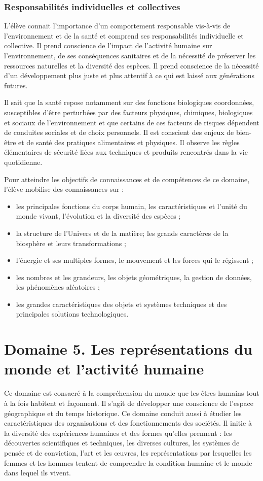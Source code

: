 \subsubsection{Responsabilités individuelles et collectives}
L’élève connait l’importance d’un comportement responsable vis-à-vis de l’environnement et de la santé et comprend ses responsabilités individuelle et collective. Il prend conscience de l’impact de l’activité humaine sur l’environnement, de ses conséquences sanitaires et de la nécessité de préserver les ressources naturelles et la diversité des espèces. Il prend conscience de la nécessité d’un développement plus juste et plus attentif à ce qui est laissé aux générations futures.

Il sait que la santé repose notamment sur des fonctions biologiques coordonnées, susceptibles d’être perturbées par des facteurs physiques, chimiques, biologiques et sociaux de l’environnement et que certains de ces facteurs de risques dépendent de conduites sociales et de choix personnels. Il est conscient des enjeux de bien-être et de santé des pratiques alimentaires et physiques. Il observe les règles élémentaires de sécurité liées aux techniques et produits rencontrés dans la vie quotidienne.
 
Pour atteindre les objectifs de connaissances et de compétences de ce domaine, l’élève mobilise des connaissances sur :
\begin{itemize}
\item les principales fonctions du corps humain, les caractéristiques et l’unité du monde vivant, l’évolution et la diversité des espèces ;
\item la structure de l’Univers et de la matière; les grands caractères de la biosphère et leurs transformations ;
\item l’énergie et ses multiples formes, le mouvement et les forces qui le régissent ;
\item les nombres et les grandeurs, les objets géométriques, la gestion de données, les phénomènes aléatoires ;
\item les grandes caractéristiques des objets et systèmes techniques et des principales solutions technologiques.
\end{itemize}

\section{Domaine 5. Les représentations du monde et l’activité humaine}
Ce domaine est consacré à la compréhension du monde que les êtres humains tout à la fois habitent et façonnent. Il s’agit de développer une conscience de l’espace géographique et du temps historique. Ce domaine conduit aussi à étudier les caractéristiques des organisations et des fonctionnements des sociétés. Il initie à la diversité des expériences humaines et des formes qu’elles prennent : les découvertes scientifiques et techniques, les diverses cultures, les systèmes de pensée et de conviction, l’art et les œuvres, les représentations par lesquelles les femmes et les hommes tentent de comprendre la condition humaine et le monde dans lequel ils vivent.

